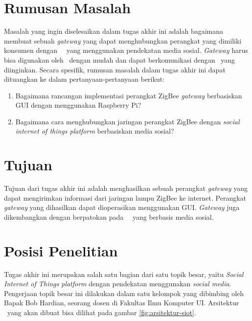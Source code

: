 \section{Rumusan Masalah}
Masalah yang ingin diselesaikan dalam tugas akhir ini adalah bagaimana membuat sebuah \textit{gateway} yang dapat menghubungkan perangkat yang dimiliki konsumen dengan \plat~\iot~yang menggunakan pendekatan media sosial. \textit{Gateway} harus bisa digunakan oleh \eu~dengan mudah dan dapat berkomunikasi dengan \plat~yang diinginkan. Secara spesifik, rumusan masalah dalam tugas akhir ini dapat dituangkan ke dalam pertanyaan-pertanyaan berikut:
\begin{enumerate}
	\item Bagaimana rancangan implementasi perangkat ZigBee \textit{gateway} berbasiskan GUI dengan menggunakan Raspberry Pi?
	\item Bagaimana cara menghubungkan jaringan perangkat ZigBee dengan \textit{social internet of things platform} berbasiskan media sosial?
\end{enumerate}

\section{Tujuan}
Tujuan dari tugas akhir ini adalah menghasilkan sebuah perangkat \textit{gateway} yang dapat mengirimkan informasi dari jaringan lampu ZigBee ke internet. Perangkat \textit{gateway} yang dihasilkan dapat dioperasikan menggunakan GUI. \textit{Gateway} juga dikembangkan dengan berpatokan pada \plat~\iot~yang berbasis media sosial. 

\section{Posisi Penelitian}

Tugas akhir ini merupakan salah satu bagian dari satu topik besar, yaitu \textit{Social Internet of Things platform} dengan pendekatan menggunakan \textit{social media}. Pengerjaan topik besar ini dilakukan dalam satu kelompok yang dibimbing oleh Bapak Bob Hardian, seorang dosen di Fakultas Ilmu Komputer UI. Arsitektur \plat~yang akan dibuat bisa dilihat pada gambar \ref{fig:arsitektur-siot}.

